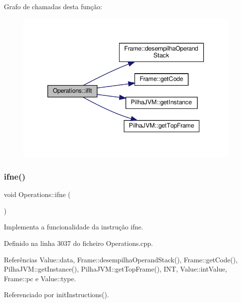 Grafo de chamadas desta função\+:
\nopagebreak
\begin{figure}[H]
\begin{center}
\leavevmode
\includegraphics[width=333pt]{classOperations_a0a9460ea938fc3a9bbd2102578d50ee2_cgraph}
\end{center}
\end{figure}
\mbox{\label{classOperations_aaadc2a6aaf1d3be06e918930622dad29}} 
\subsubsection{\texorpdfstring{ifne()}{ifne()}}
{\footnotesize\ttfamily void Operations\+::ifne (\begin{DoxyParamCaption}{ }\end{DoxyParamCaption})\hspace{0.3cm}{\ttfamily [private]}}



Implementa a funcionalidade da instrução ifne. 



Definido na linha 3037 do ficheiro Operations.\+cpp.



Referências Value\+::data, Frame\+::desempilha\+Operand\+Stack(), Frame\+::get\+Code(), Pilha\+J\+V\+M\+::get\+Instance(), Pilha\+J\+V\+M\+::get\+Top\+Frame(), I\+NT, Value\+::int\+Value, Frame\+::pc e Value\+::type.



Referenciado por init\+Instructions().

